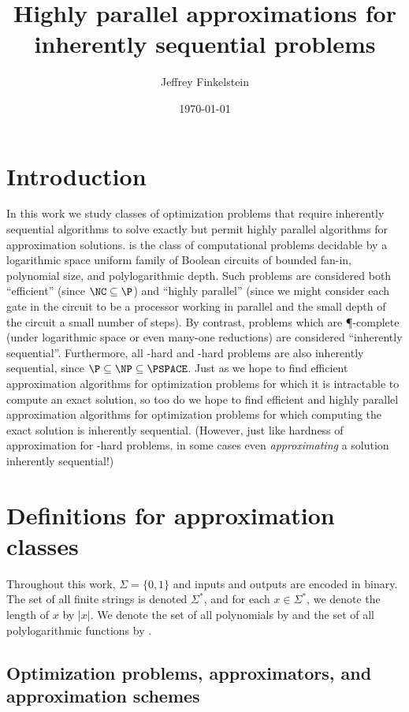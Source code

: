 \documentclass[]{article}
\author{Jef{}frey Finkelstein}
\date{\today}
\title{Highly parallel approximations for inherently sequential problems}
\theoremstyle{plain}
\theoremstyle{definition}
\begin{document}
\maketitle

\section{Introduction}

In this work we study classes of optimization problems that require inherently sequential algorithms to solve exactly but permit highly parallel algorithms for approximation solutions.
\NC{} is the class of computational problems decidable by a logarithmic space uniform family of Boolean circuits of bounded fan-in, polynomial size, and polylogarithmic depth.
Such problems are considered both ``efficient'' (since $\NC \subseteq \P$) and ``highly parallel'' (since we might consider each gate in the circuit to be a processor working in parallel and the small depth of the circuit a small number of steps).
By contrast, problems which are \P-complete (under logarithmic space or even \NC{} many-one reductions) are considered ``inherently sequential''.
Furthermore, all \NP-hard and \PSPACE-hard problems are also inherently sequential, since $\P \subseteq \NP \subseteq \PSPACE$.
Just as we hope to find efficient approximation algorithms for optimization problems for which it is intractable to compute an exact solution, so too do we hope to find efficient and highly parallel approximation algorithms for optimization problems for which computing the exact solution is inherently sequential.
(However, just like hardness of approximation for \NP-hard problems, in some cases even \emph{approximating} a solution inherently sequential!)

\section{Definitions for \texorpdfstring{\NC}{NC} approximation classes}

Throughout this work, $\Sigma=\{0, 1\}$ and inputs and outputs are encoded in binary.
The set of all finite strings is denoted $\Sigma^*$, and for each $x\in\Sigma^*$, we denote the length of $x$ by $|x|$.
We denote the set of all polynomials by \poly{} and the set of all polylogarithmic functions by \polylog.

\subsection{Optimization problems, approximators, and approximation schemes}
\end{document}
